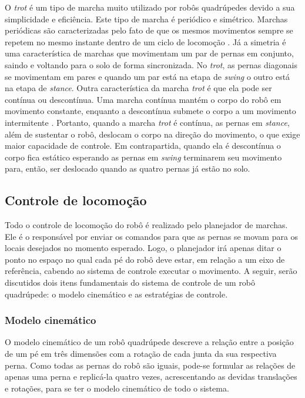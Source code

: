 \documentclass[../main.tex]{subfiles}
\begin{document}
O \textit{trot} é um tipo de marcha muito utilizado por robôs quadrúpedes devido a sua simplicidade e eficiência. Este tipo de marcha é periódico e simétrico. Marchas periódicas são caracterizadas pelo fato de que os mesmos movimentos sempre se repetem no mesmo instante dentro de um ciclo de locomoção \cite{de2006quadrupedal}. Já a simetria é uma característica de marchas que movimentam um par de pernas em conjunto, saindo e voltando para o solo de forma sincronizada. No \textit{trot}, as pernas diagonais se movimentam em pares e quando um par está na etapa de \textit{swing} o outro está na etapa de \textit{stance}. Outra característica da marcha \textit{trot} é que ela pode ser contínua ou descontínua. Uma marcha contínua mantém o corpo do robô em movimento constante, enquanto a descontínua submete o corpo a um movimento intermitente \cite{de2006quadrupedal}. Portanto, quando a marcha \textit{trot} é contínua, as pernas em \textit{stance}, além de sustentar o robô, deslocam o corpo na direção do movimento, o que exige maior capacidade de controle. Em contrapartida, quando ela é descontínua o corpo fica estático esperando as pernas em \textit{swing} terminarem seu movimento para, então, ser deslocado quando as quatro pernas já estão no solo.

\subsection{Controle de locomoção}

Todo o controle de locomoção do robô é realizado pelo planejador de marchas. Ele é o responsável por enviar os comandos para que as pernas se movam para os locais desejados no momento esperado. Logo, o planejador irá apenas ditar o ponto no espaço no qual cada pé do robô deve estar, em relação a um eixo de referência, cabendo ao sistema de controle executar o movimento. A seguir, serão discutidos dois itens fundamentais do sistema de controle de um robô quadrúpede: o modelo cinemático e as estratégias de controle.

\subsubsection{Modelo cinemático}
O modelo cinemático de um robô quadrúpede descreve a relação entre a posição de um pé em três dimensões com a rotação de cada junta da sua respectiva perna. Como todas as pernas do robô são iguais, pode-se formular as relações de apenas uma perna e replicá-la quatro vezes, acrescentando as devidas translações e rotações, para se ter o modelo cinemático de todo o sistema.
\end{document}
